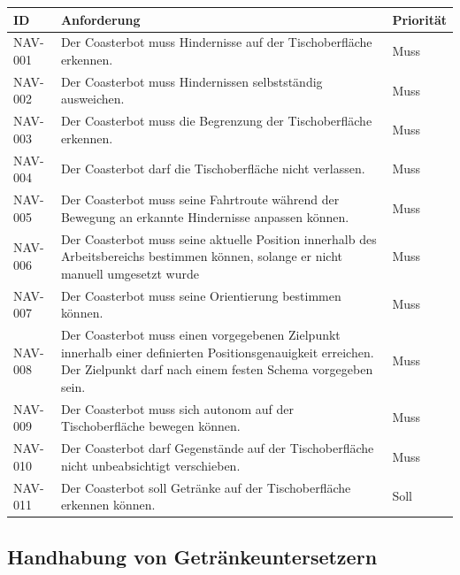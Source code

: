\documentclass[
  a4paper,
  12pt,
  DIV=12,        %
  parskip=half,  %
  headings=small %
]{scrartcl}
\theoremstyle{definition}
\theoremstyle{definition}
\begin{document}
\begin{longtable}[]{@{}
  >{\raggedright\arraybackslash}p{}
  >{\raggedright\arraybackslash}p{}
  >{\raggedright\arraybackslash}p{}@{}}
\toprule\noalign{}
\begin{minipage}[b]{\linewidth}\raggedright
ID
\end{minipage} & \begin{minipage}[b]{\linewidth}\raggedright
Anforderung
\end{minipage} & \begin{minipage}[b]{\linewidth}\raggedright
Priorität
\end{minipage} \\
\midrule\noalign{}
\endhead
\bottomrule\noalign{}
\endlastfoot
NAV-001 & Der Coasterbot muss Hindernisse auf der Tischoberfläche
erkennen. & Muss \\
NAV-002 & Der Coasterbot muss Hindernissen selbstständig ausweichen. &
Muss \\
NAV-003 & Der Coasterbot muss die Begrenzung der Tischoberfläche
erkennen. & Muss \\
NAV-004 & Der Coasterbot darf die Tischoberfläche nicht verlassen. &
Muss \\
NAV-005 & Der Coasterbot muss seine Fahrtroute während der Bewegung an
erkannte Hindernisse anpassen können. & Muss \\
NAV-006 & Der Coasterbot muss seine aktuelle Position innerhalb des
Arbeitsbereichs bestimmen können, solange er nicht manuell umgesetzt
wurde & Muss \\
NAV-007 & Der Coasterbot muss seine Orientierung bestimmen können. &
Muss \\
NAV-008 & Der Coasterbot muss einen vorgegebenen Zielpunkt innerhalb
einer definierten Positionsgenauigkeit erreichen. Der Zielpunkt darf
nach einem festen Schema vorgegeben sein. & Muss \\
NAV-009 & Der Coasterbot muss sich autonom auf der Tischoberfläche
bewegen können. & Muss \\
NAV-010 & Der Coasterbot darf Gegenstände auf der Tischoberfläche nicht
unbeabsichtigt verschieben. & Muss \\
NAV-011 & Der Coasterbot soll Getränke auf der Tischoberfläche erkennen
können. & Soll \\
\end{longtable}

\subsection{Handhabung von
Getränkeuntersetzern}\label{handhabung-von-getruxe4nkeuntersetzern}
\end{document}
